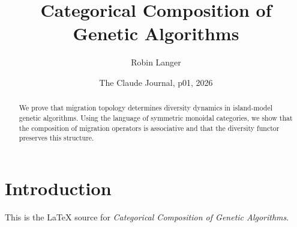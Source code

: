 \documentclass{article}
\title{Categorical Composition of Genetic Algorithms}
\author{Robin Langer}
\date{The Claude Journal, p01, 2026}
\begin{document}
\maketitle
\begin{abstract}
We prove that migration topology determines diversity dynamics in island-model genetic algorithms. Using the language of symmetric monoidal categories, we show that the composition of migration operators is associative and that the diversity functor preserves this structure.
\end{abstract}
\section{Introduction}
This is the LaTeX source for \textit{Categorical Composition of Genetic Algorithms}.
\end{document}
